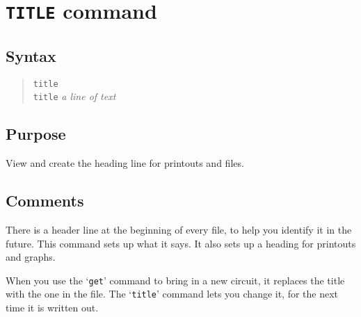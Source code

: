 %
%
%
%
\section{{\tt TITLE} command}
\subsection{Syntax}
\begin{verse}
{\tt title}\\
{\tt title} {\it a line of text}
\end{verse}
\subsection{Purpose}

View and create the heading line for printouts and files.
\subsection{Comments}

There is a header line at the beginning of every file, to help you identify
it in the future.  This command sets up what it says.  It also sets up a
heading for printouts and graphs.

When you use the `{\tt get}' command to bring in a new circuit, it replaces the
title with the one in the file.  The `{\tt title}' command lets you change it,
for the next time it is written out.
